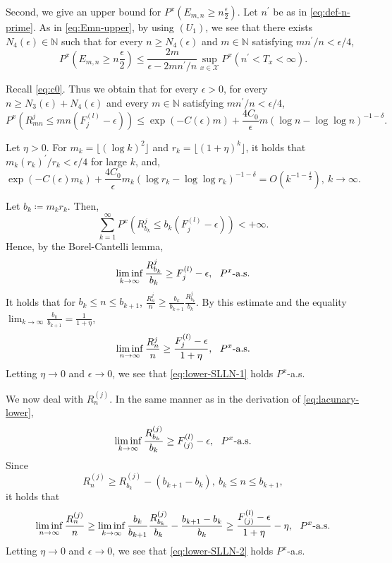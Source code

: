 \documentclass[a4paper, reqno, 11pt]{amsart}
\theoremstyle{definition}
\begin{document}
Second, we give an upper bound for $\displaystyle P^x \left( E_{m,n} \ge n \frac{\epsilon}{2} \right)$. 
Let $n^{\prime}$ be as in \eqref{eq:def-n-prime}. 
As in \eqref{eq:Emn-upper}, by using $(U_1)$,  
we see that there exists $N_4 (\epsilon) \in \mathbb{N}$ such that for every $n \ge N_4 (\epsilon)$ and $m \in \mathbb{N}$ satisfying $mn^{\prime}/n < \epsilon/4$, 
\begin{equation*}\label{eq:Emn-upper-2} 
P^x \left( E_{m,n} \ge n \frac{\epsilon}{2} \right) \le \frac{2m}{\epsilon - 2m n^{\prime}/n}  \sup_{x \in \mathcal{X}} P^x (n^{\prime} < T_x < \infty). 
\end{equation*}



Recall \eqref{eq:c0}. 
Thus we obtain that 
for every $\epsilon > 0$, 
for every $n \ge N_3 (\epsilon) + N_4 (\epsilon)$ and every $m \in \mathbb{N}$ satisfying $mn^{\prime}/n < \epsilon/4$, 
\begin{equation*}
P^x \left(R_{mn}^{j} \le mn(F_j^{(l)} - \epsilon)\right) \le \exp\left(-C(\epsilon) m \right) + \frac{4C_0}{\epsilon} m (\log n - \log \log n)^{-1-\delta}. 
\end{equation*}

Let $\eta > 0$. 
For $m_k = \lfloor (\log k)^2 \rfloor$ and $r_k = \lfloor (1+\eta)^k \rfloor$, 
it holds that $m_k (r_k)^{\prime} / r_k < \epsilon/4$ for large $k$, and, 
\[ \exp\left(-C(\epsilon) m_k \right) + \frac{4C_0}{\epsilon} m_k (\log r_k - \log \log r_k)^{-1-\delta} = O\left(k^{-1- \frac{\delta}{2}} \right), \ k \to \infty. \] 

Let $b_k \coloneqq m_k r_k$. 
Then, 
\[ \sum_{k=1}^{\infty} P^x \left(R_{b_k}^{j} \le b_k (F_j^{(l)} - \epsilon)\right) < +\infty. \]
Hence, by the Borel-Cantelli lemma, 
\[ \liminf_{k \to \infty} \frac{R_{b_k}^{j}}{b_k} \ge F_j^{(l)} - \epsilon, \ \textup{ $P^x$-a.s.}  \]
It holds that for $b_k \le n \le b_{k+1}$, 
$\displaystyle \frac{R^j_n}{n} \ge \frac{b_{k}}{b_{k+1}} \frac{R_{b_{k}}^{j}}{b_{k}}$. 
By this estimate and the equality $\displaystyle \lim_{k \to \infty} \frac{b_{k}}{b_{k+1}} = \frac{1}{1+\eta}$, 
\begin{equation}\label{eq:lacunary-lower} 
\liminf_{n \to \infty} \frac{R_{n}^{j}}{n} \ge \frac{F_j^{(l)} - \epsilon}{1+\eta}, \ \textup{ $P^x$-a.s.}  
\end{equation}
Letting  $\eta \to 0$ and $\epsilon \to 0$, 
we see that  \eqref{eq:lower-SLLN-1} holds $P^x$-a.s.  

We now deal with $R^{(j)}_n$. 
In the same manner as in the derivation of \eqref{eq:lacunary-lower},  
\[ \liminf_{k \to \infty} \frac{R_{b_k}^{(j)}}{b_k} \ge F_{(j)}^{(l)} - \epsilon, \ \textup{ $P^x$-a.s.}  \]
Since 
\[ R_n^{(j)} \ge R_{b_{k}}^{(j)} - (b_{k+1} - b_k),  \ b_k \le n \le b_{k+1},\]  
it holds that 
\[ \liminf_{n \to \infty} \frac{R_n^{(j)}}{n}  \ge \liminf_{k \to \infty} \frac{b_{k}}{b_{k+1}} \frac{R_{b_{k}}^{(j)}}{b_{k}} - \frac{b_{k+1} - b_k}{b_k} \ge \frac{F_{(j)}^{(l)} - \epsilon}{1+\eta} - \eta, \ \textup{ $P^x$-a.s.}   \]
Letting  $\eta \to 0$ and $\epsilon \to 0$, 
we see that \eqref{eq:lower-SLLN-2} holds $P^x$-a.s.  
\end{document}
